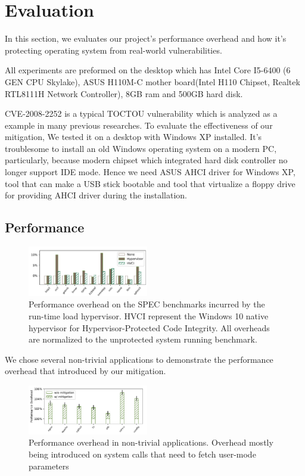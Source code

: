 \section{Evaluation}
\label{sec:evaluation}

In this section, we evaluates our project's performance overhead and how it's protecting operating system from real-world vulnerabilities.

All experiments are preformed on the desktop which has Intel Core I5-6400 (6 GEN CPU Skylake), ASUS H110M-C mother board(Intel H110 Chipset, Realtek RTL8111H Network Controller), 8GB ram and 500GB hard disk.

CVE-2008-2252 is a typical TOCTOU vulnerability which is analyzed as a example in many previous researches. To evaluate the effectiveness of our mitigation, We tested it on a desktop with Windows XP installed. It's troublesome to install an old Windows operating system on a modern PC, particularly, because modern chipset which integrated hard disk controller no longer support IDE mode. Hence we need ASUS AHCI driver for Windows XP, tool that can make a USB stick bootable and tool that virtualize a floppy drive~\cite{installxpskylake} for providing AHCI driver during the installation.

\subsection{Performance}

\begin{figure}[th]
  \includegraphics[width=0.47\textwidth]{figures/benchmark3}
  \centering
  \caption{Performance overhead on the SPEC benchmarks incurred by the run-time load hypervisor. HVCI represent the Windows 10 native hypervisor for Hypervisor-Protected Code Integrity. All overheads are normalized to the unprotected system running benchmark.}
  \label{fig:benchmark}
\end{figure}

We chose several non-trivial applications to demonstrate the performance overhead that introduced by our mitigation. 

\begin{figure}[th]
  \includegraphics[width=0.47\textwidth]{figures/performance3}
  \centering
  \caption{Performance overhead in non-trivial applications. Overhead mostly being introduced on system calls that need to fetch user-mode parameters}
  \label{fig:performance}
\end{figure}

